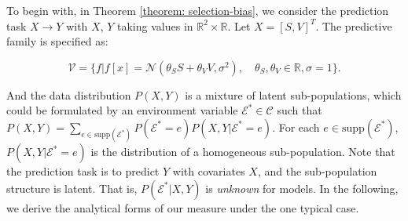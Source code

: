To begin with, in Theorem \ref{theorem: selection-bias}, we consider the prediction task $X \rightarrow Y$ with $X$, $Y$ taking values in $\mathbb R^2 \times \mathbb R$. Let $X = [S,V]^T$. The predictive family is specified as:
\begin{small} 
	\begin{equation}
	\label{equ:v_theorem23}
		\mathcal{V}=\{f|f[x]=\mathcal{N}(\theta_SS+\theta_VV, \sigma^2),\quad \theta_S,\theta_V\in \mathbb R, \sigma=1\}.
	\end{equation}
	\end{small}
And the data distribution $P(X,Y)$ is a mixture of latent sub-populations, which could be formulated by an environment variable $\mathcal E^* \in \mathcal C$ such that $P(X,Y) = \sum_{e\in \text{supp}(\mathcal E^*)} P(\mathcal E^* = e)P(X,Y|\mathcal E^* = e)$. For each $e \in \text{supp}(\mathcal E^*)$, $P(X,Y|\mathcal E^* = e)$ is the distribution of a homogeneous sub-population.
Note that the prediction task is to predict $Y$ with covariates $X$, and the sub-population structure is latent. That is, $P(\mathcal E^*|X,Y)$ is \emph{unknown} for models. In the following, we derive the analytical forms of our measure under the one typical case.
	
